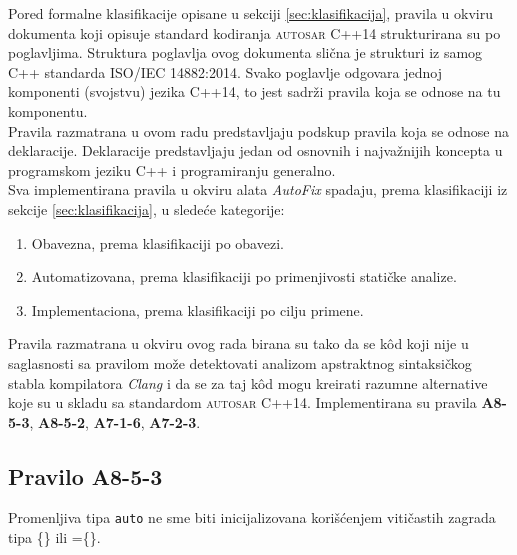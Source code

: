\documentclass[12pt,oneside]{memoir}
\begin{document}
Pored formalne klasifikacije opisane u sekciji \ref{sec:klasifikacija}, pravila u okviru dokumenta koji opisuje standard kodiranja \textsc{autosar} C++14 \cite{AutosarGuidelines} strukturirana su po poglavljima.
Struktura poglavlja ovog dokumenta slična je strukturi iz samog C++ standarda ISO/IEC 14882:2014. Svako poglavlje odgovara jednoj komponenti (svojstvu) jezika C++14, to jest sadrži pravila koja se odnose na tu komponentu.
\\
\indent
Pravila razmatrana u ovom radu predstavljaju podskup pravila koja se odnose na deklaracije. Deklaracije predstavljaju jedan
od osnovnih i najvažnijih koncepta u programskom jeziku C++ i programiranju generalno.
\\
\indent
Sva implementirana pravila u okviru alata \textit{AutoFix} spadaju, prema klasifikaciji iz sekcije \ref{sec:klasifikacija}, u sledeće kategorije:
\begin{enumerate}
  \item{Obavezna, prema klasifikaciji po obavezi.}
  \item{Automatizovana, prema klasifikaciji po primenjivosti statičke analize.}
  \item{Implementaciona, prema klasifikaciji po cilju primene.}
\end{enumerate}
Pravila razmatrana u okviru ovog rada birana su tako da se k\^{o}d koji nije u saglasnosti sa pravilom mo\v{z}e detektovati analizom apstraktnog sintaksi\v{c}kog stabla kompilatora \textit{Clang} i da se za taj k\^{o}d mogu kreirati razumne alternative koje su u skladu sa standardom \textsc{autosar} C++14.
Implementirana su pravila \textbf{A8-5-3}, \textbf{A8-5-2}, \textbf{A7-1-6}, \textbf{A7-2-3}.

\subsection{Pravilo A8-5-3}
\begin{center}
\begin{tcolorbox}
Promenljiva tipa \texttt{auto} ne sme biti inicijalizovana kori\v{s}\'{c}enjem viti\v{c}astih zagrada tipa \{\} ili =\{\}.
\end{tcolorbox}
\end{center}
\end{document}

